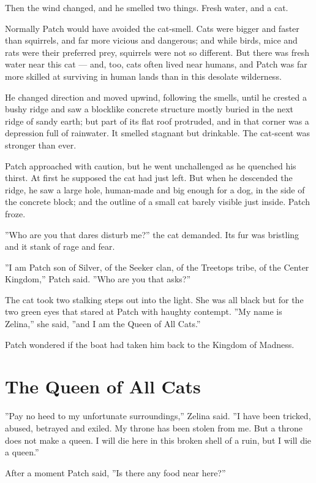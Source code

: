 \documentclass[12pt]{book}
\begin{document}
Then the wind changed, and he smelled two things. Fresh water, and a cat.

Normally Patch would have avoided the cat-smell. Cats were bigger and faster than squirrels, and far more vicious and dangerous; and while birds, mice and rats were their preferred prey, squirrels were not so different. But there was fresh water near this cat ---
and, too, cats often lived near humans, and Patch was far more skilled at surviving in human lands than in this desolate wilderness.

He changed direction and moved upwind, following the smells, until he crested a bushy ridge and saw a blocklike concrete structure mostly buried in the next ridge of sandy earth; but part of its flat roof protruded, and in that corner was a depression full of rainwater. It smelled stagnant but drinkable. The cat-scent was stronger than ever.

Patch approached with caution, but he went unchallenged as he quenched his thirst. At first he supposed the cat had just left. But when he descended the ridge, he saw a large hole, human-made and big enough for a dog, in the side of the concrete block; and the outline of a small cat barely visible just inside. Patch froze.

''Who are you that dares disturb me?'' the cat demanded. Its fur was bristling and it stank of rage and fear. 

''I am Patch son of Silver, of the Seeker clan, of the Treetops tribe, of the Center Kingdom,'' Patch said. ''Who are you that asks?''

The cat took two stalking steps out into the light. She was all black but for the two green eyes that stared at Patch with haughty contempt. ''My name is Zelina,'' she said, ''and I am the Queen of All Cats.''

Patch wondered if the boat had taken him back to the Kingdom of Madness.


\section{The Queen of All Cats}

''Pay no heed to my unfortunate surroundings,'' Zelina said. ''I have been tricked, abused, betrayed and exiled. My throne has been stolen from me. But a throne does not make a queen. I will die here in this broken shell of a ruin, but I will die a queen.''

After a moment Patch said, ''Is there any food near here?''
\end{document}
